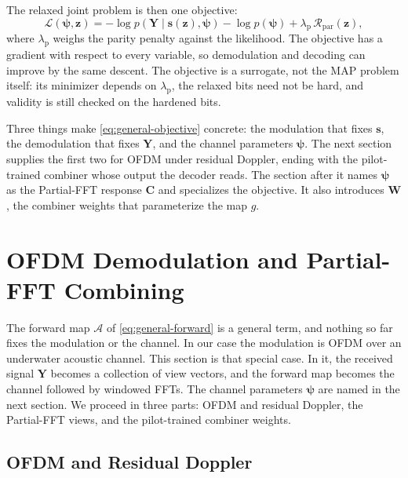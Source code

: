 \documentclass[conference]{IEEEtran}
\begin{document}
The relaxed joint problem is then one objective:
\begin{equation}
  \mathcal L(\bm\psi,\mathbf z)
  =
  -\log p\!\left(\mathbf Y\mid\mathbf s(\mathbf z),\bm\psi\right)
  -\log p(\bm\psi)
  +\lambda_{\mathrm p}\,\mathcal R_{\mathrm{par}}(\mathbf z),
  \label{eq:general-objective}
\end{equation}
where \(\lambda_{\mathrm p}\) weighs the parity penalty against the
likelihood.  The objective has a gradient with respect to every variable, so
demodulation and decoding can improve by the same descent.  The objective is
a surrogate, not the MAP problem itself: its minimizer depends on
\(\lambda_{\mathrm p}\), the relaxed bits need not be hard, and validity is
still checked on the hardened bits.

Three things make \eqref{eq:general-objective} concrete: the modulation
that fixes \(\mathbf s\), the demodulation that fixes \(\mathbf Y\), and the
channel parameters \(\bm\psi\).  The next section supplies the
first two for OFDM under residual Doppler, ending with the pilot-trained
combiner whose output the decoder reads.  The section after it names
\(\bm\psi\) as the Partial-FFT response \(\mathbf C\) and specializes the
objective.  It also introduces \(\mathbf W\), the combiner weights that
parameterize the map \(g\).

\section{OFDM Demodulation and Partial-FFT Combining}
\label{sec:ofdm}

The forward map \(\mathcal A\) of \eqref{eq:general-forward} is a general
term, and nothing so far fixes the modulation or the channel.  In our case
the modulation is OFDM over an underwater acoustic channel.  This section is
that special case.  In it, the received signal \(\mathbf Y\) becomes a
collection of view vectors, and the forward map becomes the channel followed
by windowed FFTs.  The channel parameters \(\bm\psi\) are named in the
next section.  We proceed in three parts: OFDM and residual Doppler, the
Partial-FFT views, and the pilot-trained combiner weights.

\subsection{OFDM and Residual Doppler}
\end{document}
